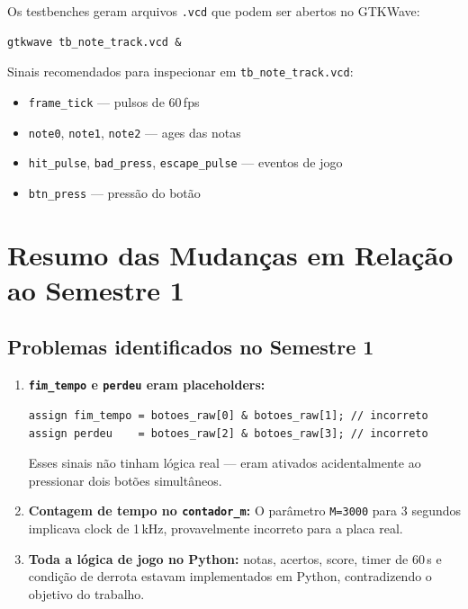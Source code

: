 \documentclass[12pt,a4paper]{article}
\begin{document}
Os testbenches geram arquivos \texttt{.vcd} que podem ser abertos no GTKWave:

\begin{lstlisting}[style=shell]
gtkwave tb_note_track.vcd &
\end{lstlisting}

Sinais recomendados para inspecionar em \texttt{tb\_note\_track.vcd}:
\begin{itemize}
    \item \texttt{frame\_tick} — pulsos de 60\,fps
    \item \texttt{note0}, \texttt{note1}, \texttt{note2} — ages das notas
    \item \texttt{hit\_pulse}, \texttt{bad\_press}, \texttt{escape\_pulse} — eventos de jogo
    \item \texttt{btn\_press} — pressão do botão
\end{itemize}

\section{Resumo das Mudanças em Relação ao Semestre 1}

\subsection{Problemas identificados no Semestre 1}

\begin{enumerate}
    \item \textbf{\texttt{fim\_tempo} e \texttt{perdeu} eram placeholders:}
    \begin{lstlisting}[style=verilog]
assign fim_tempo = botoes_raw[0] & botoes_raw[1]; // incorreto
assign perdeu    = botoes_raw[2] & botoes_raw[3]; // incorreto
    \end{lstlisting}
    Esses sinais não tinham lógica real — eram ativados acidentalmente ao pressionar dois botões simultâneos.

    \item \textbf{Contagem de tempo no \texttt{contador\_m}:}
    O parâmetro \texttt{M=3000} para 3 segundos implicava clock de 1\,kHz, provavelmente incorreto para a placa real.

    \item \textbf{Toda a lógica de jogo no Python:} notas, acertos, score, timer de 60\,s e condição de derrota estavam implementados em Python, contradizendo o objetivo do trabalho.
\end{enumerate}
\end{document}
